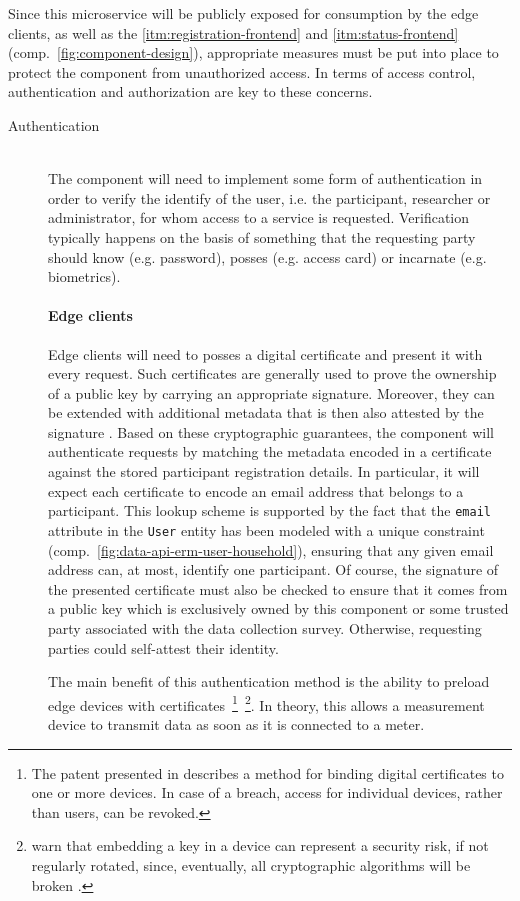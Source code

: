 Since this microservice will be publicly exposed for consumption by the edge clients, as well as the \ref{itm:registration-frontend} and \ref{itm:status-frontend} (comp.~\autoref{fig:component-design}), appropriate measures must be put into place to protect the component from unauthorized access. In terms of access control, authentication and authorization are key to these concerns.

\begin{description}

  \item[Authentication\label{itm:data-api-authentication}]
  \hfill \\
  The component will need to implement some form of authentication in order to verify the identify of the user, i.e. the participant, researcher or administrator, for whom access to a service is requested. Verification typically happens on the basis of something that the requesting party should know (e.g. password), posses (e.g. access card) or incarnate (e.g. biometrics).

  \paragraph{Edge clients}
  Edge clients will need to posses a digital certificate and present it with every request. Such certificates are generally used to prove the ownership of a public key by carrying an appropriate signature. Moreover, they can be extended with additional metadata that is then also attested by the signature \cite[p.~37]{hummen2013towards}. Based on these cryptographic guarantees, the component will authenticate requests by matching the metadata encoded in a certificate against the stored participant registration details. In particular, it will expect each certificate to encode an email address that belongs to a participant. This lookup scheme is supported by the fact that the \texttt{email} attribute in the \texttt{User} entity has been modeled with a unique constraint (comp.~\autoref{fig:data-api-erm-user-household}), ensuring that any given email address can, at most, identify one participant. Of course, the signature of the presented certificate must also be checked to ensure that it comes from a public key which is exclusively owned by this component or some trusted party associated with the data collection survey. Otherwise, requesting parties could self-attest their identity.

  The main benefit of this authentication method is the ability to preload edge devices with certificates~\footnote{The patent presented in \cite{etchegoyen2013device} describes a method for binding digital certificates to one or more devices. In case of a breach, access for individual devices, rather than users, can be revoked.}~\footnote{\citeauthor{ammar2018internet} warn that embedding a key in a device can represent a security risk, if not regularly rotated, since, eventually, all cryptographic algorithms will be broken \cite[p.~23]{ammar2018internet}.}. In theory, this allows a measurement device to transmit data as soon as it is connected to a meter.


\end{description}
